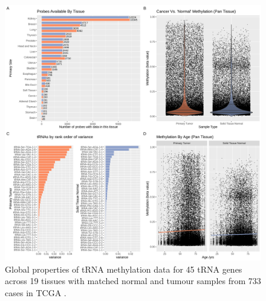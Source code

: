 \documentclass[]{book}
\begin{document}
\begin{figure}

{\centering \includegraphics[width=1\linewidth]{./figs/cancerVsNormalCombinedPlots} 

}

\caption{Global properties of tRNA methylation data for 45 tRNA genes across 19 tissues with matched normal and tumour samples from 733 cases in TCGA \citep{Yang2016, Nazor2012}.}\label{fig:cancerVsNormalCombinedPlots}
\end{figure}
\end{document}
